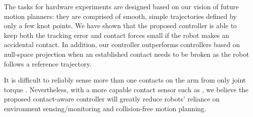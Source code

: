 The tasks for hardware experiments are designed based on our vision of future motion planners: they are comprised of smooth, simple trajectories defined by only a few knot points. We have shown that the proposed controller is able to keep both the tracking error and contact forces small if the robot makes an accidental contact. In addition, our controller outperforms controllers based on null-space projection when an established contact needs to be broken as the robot follows a reference trajectory.

It is difficult to reliably sense more than one contacts on the arm from only joint torque \cite{pang2021identifying}. Nevertheless, with a more capable contact sensor such as \cite{luo2021learning}, we believe the proposed contact-aware controller will greatly reduce robots' reliance on environment sensing/monitoring and collision-free motion planning.